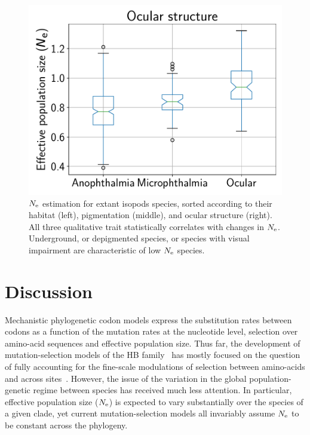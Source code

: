 \documentclass{MBE}
\begin{document}
\begin{figure}[t]
\begin{minipage}{0.32\linewidth}
			\includegraphics[width=\linewidth, page=1]{isopods/12CDS_SiteMutSelBranchNe_Rep_LogPopulationSize_eye_merged}
		\end{minipage}
		\caption[$\Ne$ as a function of traits in isopods]{
		$\Ne$ estimation for extant isopods species, sorted according to their habitat (left), pigmentation (middle), and ocular structure (right).
		All three qualitative trait statistically correlates with changes in $\Ne$.
		Underground, or depigmented species, or species with visual impairment are characteristic of low $\Ne$ species.}
		\label{fig:isopods_correlation}
	\end{figure}


	\section{Discussion}
	\label{sec:Discussion}
	Mechanistic phylogenetic {codon} models express the {substitution} rates between codons as a function of the mutation rates at the nucleotide level, selection over amino-acid sequences and {effective population size}.
	Thus far, the development of mutation-selection models of the {HB} family~\citep{Rodrigue2010, Tamuri2012} has mostly focused on the question of fully accounting for the fine-scale modulations of selection between amino-acids and across sites~\citep{Rodrigue2010, Tamuri2012}.
	However, the issue of the variation in the global population-genetic regime between species has received much less attention.
	In particular, {effective population size} ($\Ne$) is expected to vary substantially over the species of a given clade, yet current mutation-selection models all invariably assume $\Ne$ to be constant across the phylogeny.
\end{document}
